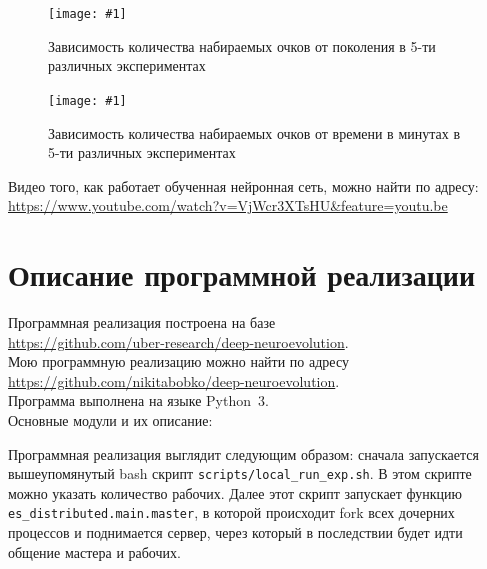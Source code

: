 \documentclass[12pt]{article}
\newcommand{\img}[3]{
    \begin{figure}[H]
        \centering
        \texttt{[image: \#1]}
        \caption{#3}
    \end{figure}
}
\begin{document}
    \img{score_plot.png}{1.0}{Зависимость количества набираемых очков от поколения в 5-ти различных экспериментах}

    \img{score_plot_per_time.png}{1.0}{Зависимость количества набираемых очков от времени в минутах в 5-ти различных экспериментах}

    Видео того, как работает обученная нейронная сеть, можно найти по адресу: \\
    \url{https://www.youtube.com/watch?v=VjWcr3XTsHU&feature=youtu.be}

\section{Описание программной реализации}
    Программная реализация построена на базе \\
    \url{https://github.com/uber-research/deep-neuroevolution}. \\
    Мою программную реализацию можно найти по адресу \\
    \url{https://github.com/nikitabobko/deep-neuroevolution}. \\
    Программа выполнена на языке Python~3.\\

    Основные модули и их описание:

    Программная реализация выглядит следующим образом: сначала запускается вышеупомянутый bash скрипт \verb!scripts/local_run_exp.sh!. В этом скрипте можно указать количество рабочих. Далее этот скрипт запускает функцию \verb!es_distributed.main.master!, в которой происходит fork всех дочерних процессов и поднимается сервер, через который в последствии будет идти общение мастера и рабочих. \\
\end{document}
